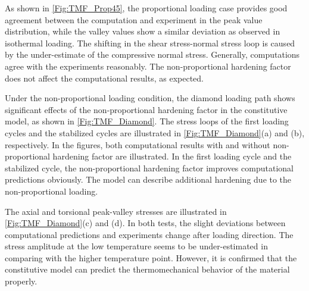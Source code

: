 As shown in \ref{Fig:TMF_Prop45}, the proportional loading case provides good agreement between the computation and experiment in the peak value distribution, while the valley values show a similar deviation as observed in isothermal loading. The shifting in the shear stress-normal stress loop is caused by the under-estimate of the compressive normal stress. Generally, computations agree with the experiments reasonably. The non-proportional hardening factor does not affect the computational results, as expected.

Under the non-proportional loading condition, the diamond loading path shows significant effects of the non-proportional hardening factor in the constitutive model, as shown in \ref{Fig:TMF_Diamond}. The stress loops of the first loading cycles and the stabilized cycles are illustrated in \ref{Fig:TMF_Diamond}(a) and (b), respectively. In the figures, both computational results with and without non-proportional hardening factor are illustrated. In the first loading cycle and the stabilized cycle, the non-proportional hardening factor improves computational predictions obviously. The model can describe additional hardening due to the non-proportional loading.

The axial and torsional peak-valley stresses are illustrated in  \ref{Fig:TMF_Diamond}(c) and (d).
In both tests, the slight deviations between computational predictions and experiments change after loading direction. The stress amplitude at the low temperature seems to be under-estimated in comparing with the higher temperature point. However, it is confirmed that the constitutive model can predict the thermomechanical behavior of the material properly.


